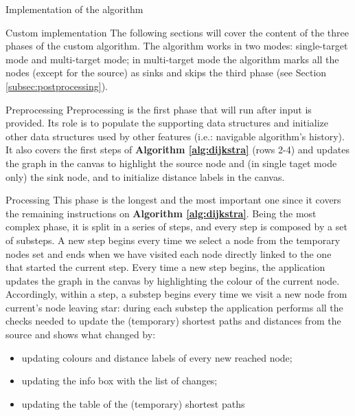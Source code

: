 \documentclass[9pt]{extarticle}
\begin{document}
\begin{section}{Implementation of the algorithm}
\begin{subsection}{Custom implementation}
            The following sections will cover the content of the three phases of the custom algorithm.
            The algorithm works in two modes: single-target mode and multi-target mode; in multi-target mode the algorithm marks 
            all the nodes (except for the source) as sinks and skips the third phase (see Section \ref{subsec:postprocessing}).

            \begin{subsubsection}{Preprocessing}
                Preprocessing is the first phase that will run after input is provided. 
                Its role is to populate the supporting data structures and initialize other data structures used by other features 
                (i.e.: navigable algorithm's history).
                It also covers the first steps of \textbf{Algorithm \ref{alg:dijkstra}} (rows 2-4) and updates the graph in the
                canvas to highlight the source node and (in single taget mode only) the sink node, and to initialize distance labels
                in the canvas. 
            \end{subsubsection}

            \begin{subsubsection}{Processing}
                This phase is the longest and the most important one since it covers the remaining instructions on \textbf{Algorithm \ref{alg:dijkstra}}.
                Being the most complex phase, it is split in a series of steps, and every step is composed by a set of substeps. 
                A new step begins every time we select a node from the temporary nodes set and ends when we have visited each 
                node directly linked to the one that started the current step. Every time a new step begins, the application updates
                the graph in the canvas by highlighting the colour of the current node. Accordingly, within a step, a substep begins
                every time we visit a new node from current's node leaving star: during each substep the application performs all the
                checks needed to update the (temporary) shortest paths and distances from the source and shows what changed by:

                \begin{itemize}
                    \item updating colours and distance labels of every new reached node;
                    \item updating the info box with the list of changes;
                    \item updating the table of the (temporary) shortest paths
                \end{itemize}


\end{subsubsection}
\end{subsection}
\end{section}
\end{document}
